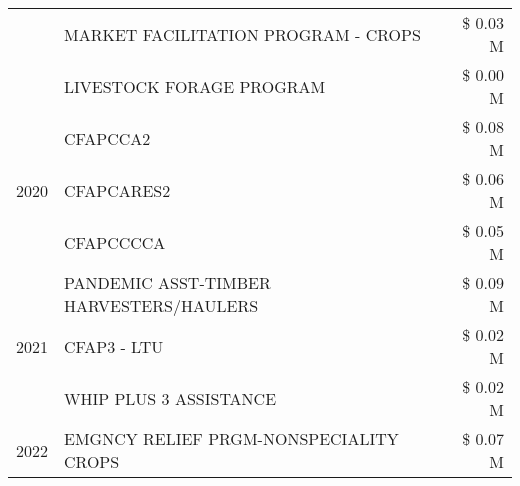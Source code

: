\begin{tabular}{llr}
 & MARKET FACILITATION PROGRAM - CROPS & \$ 0.03 M \\
 & LIVESTOCK FORAGE PROGRAM & \$ 0.00 M \\
\cline{1-3}
\multirow[t]{3}{*}{2020} & CFAPCCA2 & \$ 0.08 M \\
 & CFAPCARES2 & \$ 0.06 M \\
 & CFAPCCCCA & \$ 0.05 M \\
\cline{1-3}
\multirow[t]{3}{*}{2021} & PANDEMIC ASST-TIMBER HARVESTERS/HAULERS & \$ 0.09 M \\
 & CFAP3 - LTU & \$ 0.02 M \\
 & WHIP PLUS 3 ASSISTANCE & \$ 0.02 M \\
\cline{1-3}
2022 & EMGNCY RELIEF PRGM-NONSPECIALITY CROPS & \$ 0.07 M \\
\cline{1-3}
\bottomrule
\end{tabular}
